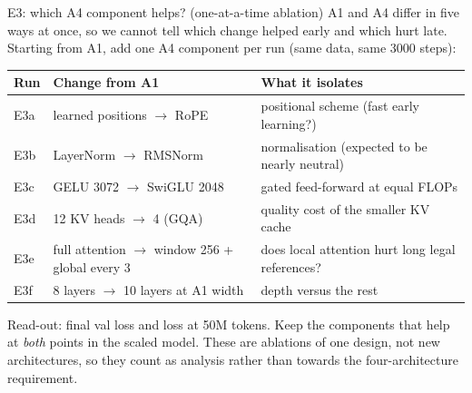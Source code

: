 \documentclass[aspectratio=169,11pt]{beamer}
\begin{document}
\begin{frame}{E3: which A4 component helps? (one-at-a-time ablation)}
  \small
  A1 and A4 differ in five ways at once, so we cannot tell which change helped early and which hurt late.
  Starting from A1, add one A4 component per run (same data, same 3000 steps):

  \vspace{2mm}
  \centering
  \begin{tabularx}{0.92\textwidth}{@{}llX@{}}
    \toprule
    Run & Change from A1 & What it isolates\\
    \midrule
    E3a & learned positions $\to$ RoPE & positional scheme (fast early learning?)\\
    E3b & LayerNorm $\to$ RMSNorm & normalisation (expected to be nearly neutral)\\
    E3c & GELU 3072 $\to$ SwiGLU 2048 & gated feed-forward at equal FLOPs\\
    E3d & 12 KV heads $\to$ 4 (GQA) & quality cost of the smaller KV cache\\
    E3e & full attention $\to$ window 256 + global every 3 & does local attention hurt long legal references?\\
    E3f & 8 layers $\to$ 10 layers at A1 width & depth versus the rest\\
    \bottomrule
  \end{tabularx}

  \vspace{2mm}
  \raggedright
  Read-out: final val loss and loss at 50M tokens. Keep the components that help at \emph{both} points in the scaled model.
  These are ablations of one design, not new architectures, so they count as analysis rather than towards the four-architecture requirement.
\end{frame}
\end{document}
